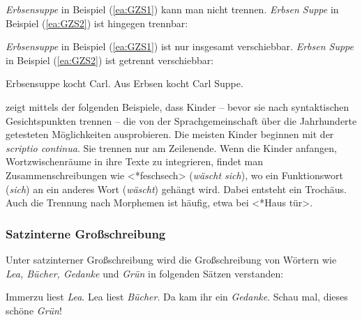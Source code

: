 \textit{Erbsensuppe} in Beispiel (\ref{ea:GZS1}) kann man nicht trennen. \textit{Erbsen Suppe} in Beispiel (\ref{ea:GZS2}) ist hingegen trennbar:

\ea \label{GZSTrennbarkeitA}
\label{ea:GZSTrennarkeitA1}
\label{ea:GZSTrennbarkeitA2}  
\z
\z

\textit{Erbsensuppe} in Beispiel (\ref{ea:GZS1}) ist nur insgesamt verschiebbar. \textit{Erbsen Suppe} in Beispiel (\ref{ea:GZS2}) ist getrennt verschiebbar:

\ea \label{GZSTrennbarkeitB}
\ea \label{ea:GZSTrennarkeitB1} Erbsensuppe kocht Carl.
\ex \label{ea:GZSTrennbarkeitB2} Aus Erbsen kocht Carl Suppe.
\z
\z

\citet[146]{Bredel2006} zeigt mittels der folgenden Beispiele, dass Kinder -- bevor sie nach syntaktischen Gesichtspunkten trennen -- die von der Sprachgemeinschaft über die Jahrhunderte getesteten Möglichkeiten ausprobieren. Die meisten Kinder beginnen mit der \textit{scriptio continua}. Sie trennen nur am Zeilenende. Wenn die Kinder anfangen, Wortzwischenräume in ihre Texte zu integrieren, findet man Zusammenschreibungen wie <*feschsech> (\textit{wäscht sich}), wo ein Funktionswort (\textit{sich}) an ein anderes Wort (\textit{wäscht}) gehängt wird. Dabei entsteht ein Trochäus. Auch die Trennung nach Morphemen ist häufig, etwa bei <*Haus tür>.


\subsubsection{Satzinterne Großschreibung}\label{sec:satzinternGroß}

Unter satzinterner Großschreibung wird die Großschreibung von Wörtern wie \textit{Lea, Bücher, Gedanke} und \textit{Grün} in folgenden Sätzen verstanden:

\ea \label{GKSA}
\ea \label{ea:GKS1} Immerzu liest \textit{Lea}.
\ex \label{ea:GKS2} Lea liest \textit{Bücher}.
\ex \label{ea:GKS3} Da kam ihr ein \textit{Gedanke}.
\ex \label{ea:GKS4} Schau mal, dieses schöne \textit{Grün}!
\z
\z

